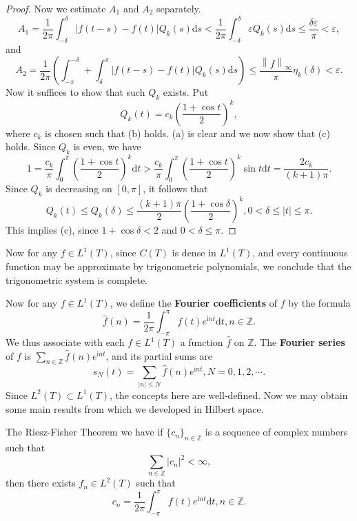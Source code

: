 \begin{proof}
Now we estimate $A_1$ and $A_2$ separately. 
$$
A_1=\frac{1}{2\pi}\int_{-\delta}^{\delta}{\left| f\left( t-s \right) -f\left( t \right) \right|Q_k\left( s \right) \mathrm{d}s}<\frac{1}{2\pi}\int_{-\delta}^{\delta}{\varepsilon Q_k\left( s \right) \mathrm{d}s}\le \frac{\delta \varepsilon}{\pi}<\varepsilon ,
$$
and 
$$
A_2=\frac{1}{2\pi}\left( \int_{-\pi}^{-\delta}{+}\int_{\delta}^{\pi}{\left| f\left( t-s \right) -f\left( t \right) \right|Q_k\left( s \right) \mathrm{d}s} \right) \le \frac{\left\| f \right\| _{\infty}}{\pi}\eta _k\left( \delta \right) <\varepsilon .
$$
Now it suffices to show that such $Q_k$ exists. Put 
$$
Q_k\left( t \right) =c_k\left( \frac{1+\cos t}{2} \right) ^k,
$$
where $c_k$ is chosen such that (b) holds. (a) is clear and we now show that (c) holds. Since $Q_k$ is even, we have 
$$
1=\frac{c_k}{\pi}\int_0^{\pi}{\left( \frac{1+\cos t}{2} \right) ^k\mathrm{d}t}>\frac{c_k}{\pi}\int_0^{\pi}{\left( \frac{1+\cos t}{2} \right) ^k\sin t\mathrm{d}t}=\frac{2c_k}{\left( k+1 \right) \pi}.
$$
Since $Q_k$ is decreasing on $[0,\pi]$, it follows that 
$$
Q_k\left( t \right) \le Q_k\left( \delta \right) \le \frac{\left( k+1 \right) \pi}{2}\left( \frac{1+\cos \delta}{2} \right) ^k,0<\delta \le \left| t \right|\le \pi .
$$
This implies (c), since $1+\cos\delta<2$ and $0<\delta\le\pi$.
\end{proof}
Now for any $f\in L^1(T)$, since $C(T)$ is dense in $L^1(T)$, and every continuous function may be approximate by trigonometric polynomials, we conclude that the trigonometric system is complete.\par
Now for any $f\in L^1(T)$, we define the \textbf{Fourier coefficients} of $f$ by the formula 
$$
\widehat{f}\left( n \right) =\frac{1}{2\pi}\int_{-\pi}^{\pi}{f\left( t \right) e^{\mathrm{i}nt}\mathrm{d}t},n\in \mathbb{Z} .
$$
We thus associate with each $f\in L^1(T)$ a function $\widehat{f}$ on $\mathbb{Z}$. The \textbf{Fourier series} of $f$ is $\sum_{n\in\mathbb{Z}}\widehat{f}(n)e^{\mathrm{i}nt}$, and its partial sums are 
$$
s_N\left( t \right) =\sum_{\left| n \right|\le N}{\widehat{f}\left( n \right) e^{\mathrm{i}nt}},N=0,1,2,\cdots .
$$
Since $L^2(T)\subset L^1(T)$, the concepts here are well-defined. Now we may obtain some main results from which we developed in Hilbert space.\par
The Riesz-Fisher Theorem we have if $\{c_n\}_{n\in\mathbb{Z}}$ is a sequence of complex numbers such that 
$$
\sum_{n\in \mathbb{Z}}{\left| c_n \right|^2}<\infty ,
$$
then there exists $f_n\in L^2(T)$ such that 
$$
c_n=\frac{1}{2\pi}\int_{-\pi}^{\pi}{f\left( t \right) e^{\mathrm{i}nt}\mathrm{d}t},n\in \mathbb{Z} .
$$
